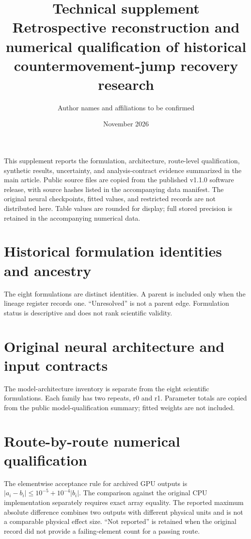\documentclass[10pt,a4paper]{article}
\title{Technical supplement\\[0.5em]\large Retrospective reconstruction and numerical qualification of historical countermovement-jump recovery research}
\author{Author names and affiliations to be confirmed}
\date{November 2026}
\begin{document}
\maketitle

This supplement reports the formulation, architecture, route-level qualification, synthetic results, uncertainty, and analysis-contract evidence summarized in the main article. Public source files are copied from the published v1.1.0 software release, with source hashes listed in the accompanying data manifest. The original neural checkpoints, fitted values, and restricted records are not distributed here. Table values are rounded for display; full stored precision is retained in the accompanying numerical data.

\section{Historical formulation identities and ancestry}

The eight formulations are distinct identities. A parent is included only when the lineage register records one. “Unresolved” is not a parent edge. Formulation status is descriptive and does not rank scientific validity.



\section{Original neural architecture and input contracts}

The model-architecture inventory is separate from the eight scientific formulations. Each family has two repeats, r0 and r1. Parameter totals are copied from the public model-qualification summary; fitted weights are not included.



\section{Route-by-route numerical qualification}

The elementwise acceptance rule for archived GPU outputs is \(|a_i-b_i|\leq 10^{-5}+10^{-4}|b_i|\). The comparison against the original CPU implementation separately requires exact array equality. The reported maximum absolute difference combines two outputs with different physical units and is not a comparable physical effect size. “Not reported” is retained when the original record did not provide a failing-element count for a passing route.
\end{document}

